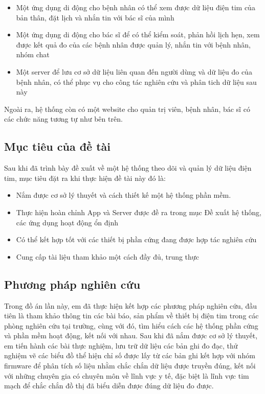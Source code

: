 \begin{adjustwidth}{1.5em}{}
  \begin{itemize}
      \item Một ứng dụng di động cho bệnh nhân có thể xem được dữ liệu điện tim của bản thân, đặt lịch và nhắn tin với bác sĩ của mình
      \item Một ứng dụng di động cho bác sĩ để có thể kiểm soát, phản hồi lịch hẹn, xem được kết quả đo của các bệnh nhân được quản lý, nhắn tin với bệnh nhân, nhóm chat
      \item Một server để lưu cơ sở dữ liệu liên quan đến người dùng và dữ liệu đo của bệnh nhân, có thể phục vụ cho công tác nghiên cứu và phân tich dữ liệu sau này

  \end{itemize}
  \end{adjustwidth}

Ngoài ra, hệ thống còn có một website cho quản trị viên, bệnh nhân, bác sĩ có các chức năng tương tự như bên trên.
\subsection*{Mục tiêu của đề tài}
Sau khi đã trình bày đề xuất về một hệ thống theo dõi và quản lý dữ liệu điện tim, mục tiêu đặt ra khi thực hiện
đề tài này đó là:

\begin{adjustwidth}{1.5em}{}
  \begin{itemize}
      \item Nắm được cơ sở lý thuyết và cách thiết kế một hệ thống phần mềm.
      \item Thực hiện hoàn chỉnh App và Server được đề ra trong mục Đề xuất hệ thống, các ứng dụng hoạt động ổn định
      \item Có thể kết hợp tốt với các thiết bị phần cứng đang được hợp tác nghiên cứu
      \item Cung cấp tài liệu tham khảo một cách đầy đủ, trung thực

  \end{itemize}
  \end{adjustwidth}





\subsection*{Phương pháp nghiên cứu}
Trong đồ án lần này, em đã thực hiện kết hợp các phương pháp nghiên cứu, đầu tiên là tham khảo thông tin các bài
báo, sản phẩm về thiết bị điện tim trong các phòng nghiên cứu tại trường, cùng với đó, tìm hiểu cách các hệ thống phần cứng và phần mềm hoạt động,
kết nối với nhau. Sau khi đã nắm được cơ sở lý thuyết, em tiến hành các bài thực nghiệm, lưu trữ dữ liệu các bản ghi đo đạc, thử nghiệm vẽ các biểu đồ thể hiện chỉ số được lấy từ các bản ghi
kết hợp với nhóm firmware để phân tích số liệu nhằm chắc chắn dữ liệu được truyền đúng, kết nối với những chuyên gia có chuyên môn về lĩnh vực y tế, đặc biệt là lĩnh vực tim mạch để chắc chắn đồ thị đã biểu diễn được đúng dữ liệu đo được.

